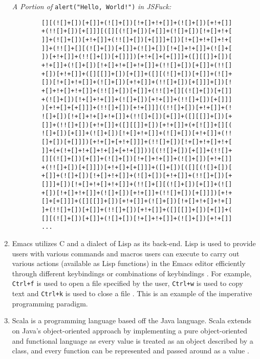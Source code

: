 \documentclass{article}
\begin{document}
\begin{enumerate}
    \textit{A Portion of} \verb|alert("Hello, World!")| \textit{in JSFuck:}
    \begin{verbatim}
        [][(![]+[])[+[]]+(![]+[])[!+[]+!+[]]+(![]+[])[+!+[]]
        +(!![]+[])[+[]]][([][(![]+[])[+[]]+(![]+[])[!+[]+!+[
        ]]+(![]+[])[+!+[]]+(!![]+[])[+[]]]+[])[!+[]+!+[]+!+[
        ]]+(!![]+[][(![]+[])[+[]]+(![]+[])[!+[]+!+[]]+(![]+[
        ])[+!+[]]+(!![]+[])[+[]]])[+!+[]+[+[]]]+([][[]]+[])[
        +!+[]]+(![]+[])[!+[]+!+[]+!+[]]+(!![]+[])[+[]]+(!![]
        +[])[+!+[]]+([][[]]+[])[+[]]+([][(![]+[])[+[]]+(![]+
        [])[!+[]+!+[]]+(![]+[])[+!+[]]+(!![]+[])[+[]]]+[])[!
        +[]+!+[]+!+[]]+(!![]+[])[+[]]+(!![]+[][(![]+[])[+[]]
        +(![]+[])[!+[]+!+[]]+(![]+[])[+!+[]]+(!![]+[])[+[]]]
        )[+!+[]+[+[]]]+(!![]+[])[+!+[]]]((!![]+[])[+!+[]]+(!
        ![]+[])[!+[]+!+[]+!+[]]+(!![]+[])[+[]]+([][[]]+[])[+
        []]+(!![]+[])[+!+[]]+([][[]]+[])[+!+[]]+(+[![]]+[][(
        ![]+[])[+[]]+(![]+[])[!+[]+!+[]]+(![]+[])[+!+[]]+(!!
        []+[])[+[]]])[+!+[]+[+!+[]]]+(!![]+[])[!+[]+!+[]+!+[
        ]]+(+(!+[]+!+[]+!+[]+[+!+[]]))[(!![]+[])[+[]]+(!![]+
        [][(![]+[])[+[]]+(![]+[])[!+[]+!+[]]+(![]+[])[+!+[]]
        +(!![]+[])[+[]]])[+!+[]+[+[]]]+([]+[])[([][(![]+[])[
        +[]]+(![]+[])[!+[]+!+[]]+(![]+[])[+!+[]]+(!![]+[])[+
        []]]+[])[!+[]+!+[]+!+[]]+(!![]+[][(![]+[])[+[]]+(![]
        +[])[!+[]+!+[]]+(![]+[])[+!+[]]+(!![]+[])[+[]]])[+!+
        []+[+[]]]+([][[]]+[])[+!+[]]+(![]+[])[!+[]+!+[]+!+[]
        ]+(!![]+[])[+[]]+(!![]+[])[+!+[]]+([][[]]+[])[+[]]+(
        [][(![]+[])[+[]]+(![]+[])[!+[]+!+[]]+(![]+[])[+!+[]]
        ... 
    \end{verbatim}

    \item Emacs utilizes C and a dialect of Lisp as its back-end. Lisp is used to provide users with various commands and macros users can execute to carry out various actions (available as Lisp functions) in the Emacs editor efficiently through different keybindings or combinations of keybindings \cite{Klaatu_2023}. For example, \verb|Ctrl+f| is used to open a file specified by the user, \verb|Ctrl+w| is used to copy text and \verb|Ctrl+k| is used to close a file \cite{Klaatu_2023}. This is an example of the imperative programming paradigm. \\
    
    \item Scala is a programming language based off the Java language. Scala extends on Java’s object-oriented approach by implementing a pure object-oriented and functional language as every value is treated as an object described by a class, and every function can be represented and passed around as a value \cite{Odersky_Altherr_Cremet_Dubochet_Emir_Haller_Micheloud_Mihaylov_Moors_Rytz_etal._2023}. \\
    

\end{enumerate}
\end{document}
